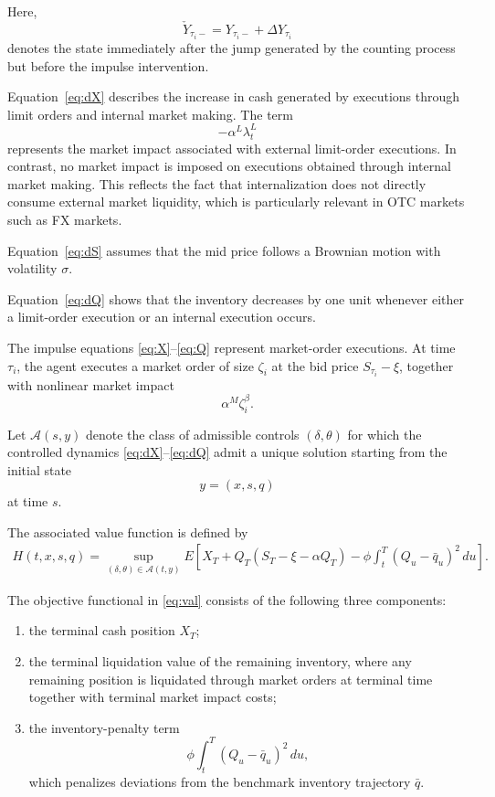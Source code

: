 \documentclass[12pt]{article}
\begin{document}
Here,
\[
\check Y_{\tau_i-}
=
Y_{\tau_i-}+\Delta Y_{\tau_i}
\]
denotes the state immediately after the jump generated by the counting process but before the impulse intervention.

Equation~\eqref{eq:dX}
describes the increase in cash generated by executions through limit orders and internal market making.
The term
\[
-\alpha^L\lambda^L_t
\]
represents the market impact associated with external limit-order executions.
In contrast, no market impact is imposed on executions obtained through internal market making.
This reflects the fact that internalization does not directly consume external market liquidity, which is particularly relevant in OTC markets such as FX markets.

Equation~\eqref{eq:dS}
assumes that the mid price follows a Brownian motion with volatility $\sigma$.

Equation~\eqref{eq:dQ}
shows that the inventory decreases by one unit whenever either a limit-order execution or an internal execution occurs.

The impulse equations
\eqref{eq:X}--\eqref{eq:Q}
represent market-order executions.
At time $\tau_i$, the agent executes a market order of size $\zeta_i$ at the bid price
$S_{\tau_i}-\xi$,
together with nonlinear market impact
\[
\alpha^M\zeta_i^\beta.
\]

Let $\mathcal A(s,y)$ denote the class of admissible controls
$(\delta,\theta)$
for which the controlled dynamics
\eqref{eq:dX}--\eqref{eq:dQ}
admit a unique solution starting from the initial state
\[
y=(x,s,q)
\]
at time $s$.

The associated value function is defined by
\begin{align}
H(t,x,s,q)
=
\sup_{(\delta,\theta)\in\mathcal A(t,y)}
E\left[
X_T
+
Q_T(S_T-\xi-\alpha Q_T)
-
\phi
\int_t^T
(Q_u-\bar q_u)^2\,du
\right].
\label{eq:val}
\end{align}

The objective functional in \eqref{eq:val}
consists of the following three components:
\begin{enumerate}
  \item
  the terminal cash position $X_T$;

  \item
  the terminal liquidation value of the remaining inventory,
  where any remaining position is liquidated through market orders at terminal time together with terminal market impact costs;

  \item
  the inventory-penalty term
  \[
  \phi\int_t^T(Q_u-\bar q_u)^2\,du,
  \]
  which penalizes deviations from the benchmark inventory trajectory $\bar q$.
\end{enumerate}
\end{document}
